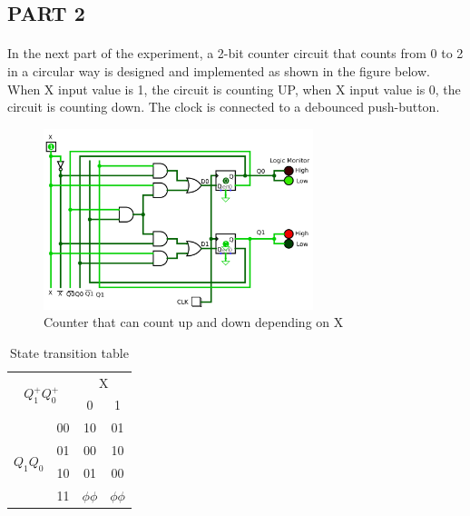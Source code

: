 \documentclass[pdftex,12pt,a4paper]{article}
\begin{document}
\begin{flushleft}
\subsection{PART 2}
\paragraph{}
In the next part of the experiment, a 2-bit counter circuit that counts from 0 to 2 in a circular way is designed and implemented as shown in the figure below.  When X input value is 1, the circuit is counting UP,  when X input value is 0, the circuit is counting down.  The clock is connected to a debounced push-button. 

\begin{figure}[h]
	\centering
	\includegraphics[width=0.7\textwidth]{part2.png}	
	\caption{Counter that can count up and down depending on X}
	\label{circ:part2}
\end{figure}

\newpage

\begin{table}[h]
\centering
\begin{tabular}{cc|cc}
\multicolumn{2}{c|}{\multirow{2}{*}{$Q^{+}_{1}Q^{+}_{0}$}} & \multicolumn{2}{c}{X}   \\
\multicolumn{2}{c|}{}                                      & 0          & 1          \\ \hline
\multirow{4}{*}{$Q_{1}Q_{0}$}             & 00             & 10         & 01         \\
                                          & 01             & 00         & 10         \\
                                          & 10             & 01         & 00         \\
                                          & 11             & $\phi\phi$ & $\phi\phi$
\end{tabular}
\caption{State transition table}
\label{tab:part2}
\end{table}





\end{flushleft}
\end{document}
